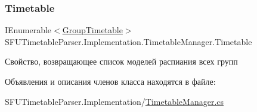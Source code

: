 \subsubsection{\texorpdfstring{Timetable}{Timetable}}
{\footnotesize\ttfamily I\+Enumerable$<$\hyperlink{class_s_f_u_timetable_parser_1_1_core_1_1_entities_1_1_group_timetable}{Group\+Timetable}$>$ S\+F\+U\+Timetable\+Parser.\+Implementation.\+Timetable\+Manager.\+Timetable\hspace{0.3cm}{\ttfamily [get]}}

Свойство, возвращающее список моделей распиания всех групп 

Объявления и описания членов класса находятся в файле\+:\begin{DoxyCompactItemize}
\item 
S\+F\+U\+Timetable\+Parser.\+Implementation/\hyperlink{_timetable_manager_8cs}{Timetable\+Manager.\+cs}\end{DoxyCompactItemize}
